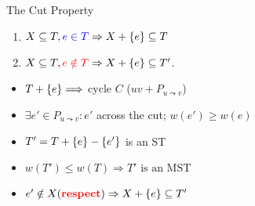 \begin{frame}{The Cut Property}
  \begin{enumerate}
	\item<1-> $X \subseteq T, \textcolor{blue}{e \in T} \Rightarrow X + \{e\} \subseteq T$
	\item<2-> $X \subseteq T, \textcolor{red}{e \notin T} \Rightarrow X + \{e\} \subseteq T'$.
  \end{enumerate}

  \vspace{-0.30cm}


  \begin{itemize}
	\item<5-> $T + \{e\} \Longrightarrow$ cycle $C$ ($uv + P_{u \leadsto v}$)
	\item<6-> $\exists e' \in P_{u \leadsto v} \colon e'$ across the cut; $w(e') \geq w(e)$
    \item<7-> $T' = T + \{e\} - \{e'\}$ is an ST
    \item<8-> $w(T') \le w(T) \Rightarrow T' \textrm{ is an MST}$
	\item<9-> $e' \notin X {\scriptsize (\textcolor{red}{\bf respect})} \Rightarrow X + \{e\} \subseteq T'$
  \end{itemize}
\end{frame}
